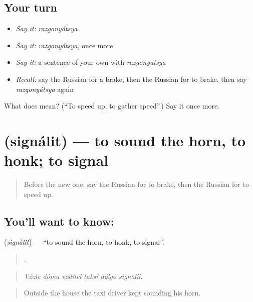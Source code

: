 \subsection*{Your turn}
\begin{itemize}
\raggedright
  \item \emph{Say it:} \emph{razgonyátsya}
  \item \emph{Say it:} \emph{razgonyátsya}, once more
  \item \emph{Say it:} a sentence of your own with \emph{razgonyátsya}
  \item \emph{Recall:} say the Russian for a brake, then the Russian for to brake, then say \emph{razgonyátsya} again
\end{itemize}

\begin{tcolorbox}[breakable,colback=teal!4,colframe=teal!35!black,title={Before you move on}]
What does  mean? (\textquotedblleft{}To speed up, to gather speed\textquotedblright{}.) Say it once more.
\end{tcolorbox}
\section[\texorpdfstring{\ru{сигналить} (signálit)}{сигналить (signálit)}]{ (signálit) — to sound the horn, to honk; to signal}

\label{lesson:RU-C403-signalit}



\begin{quote}
Before the new one: say the Russian for to brake, then the Russian for to speed up.
\end{quote}

\subsection*{You'll want to know: }
\textbf{} (\emph{signálit}) — \textquotedblleft{}to sound the horn, to honk; to signal\textquotedblright{}.

\begin{quote}
     .
\end{quote}

\begin{quote}
\emph{Vózle dóma vodítel taksí dólgo signálil.}
\end{quote}

\begin{quote}
Outside the house the taxi driver kept sounding his horn.
\end{quote}

